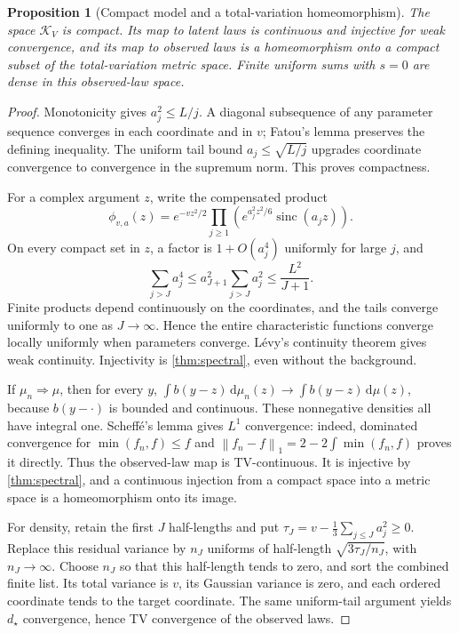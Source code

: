 \documentclass[11pt,letterpaper]{article}
\numberwithin{equation}{section}
\newtheorem{proposition}[theorem]{Proposition}
\theoremstyle{definition}
\theoremstyle{remark}
\newcommand{\sinc}{\operatorname{sinc}}
\newcommand{\norm}[1]{\left\lVert#1\right\rVert}
\newcommand{\dd}{\,\mathrm d}
\newcommand{\K}{\mathcal K_V}
\begin{document}
\begin{proposition}[Compact model and a total-variation homeomorphism]
\label{prop:compact}
The space $\K$ is compact. Its map to latent laws is continuous and injective
for weak convergence, and its map to observed laws is a homeomorphism onto a
compact subset of the total-variation metric space. Finite uniform sums with
$s=0$ are dense in this observed-law space.
\end{proposition}
\begin{proof}
Monotonicity gives $a_j^2\le L/j$. A diagonal subsequence of any parameter
sequence converges in each coordinate and in $v$; Fatou's lemma preserves
the defining inequality. The uniform tail bound $a_j\le\sqrt{L/j}$ upgrades
coordinate convergence to convergence in the supremum norm. This proves
compactness.

For a complex argument $z$, write the compensated product
\begin{equation}
 \phi_{v,a}(z)=e^{-vz^2/2}
 \prod_{j\ge1}\left(e^{a_j^2z^2/6}\sinc(a_jz)\right).
 \label{eq:compensated}
\end{equation}
On every compact set in $z$, a factor is $1+O(a_j^4)$ uniformly for large $j$,
and
\begin{equation}
 \sum_{j>J}a_j^4\le a_{J+1}^2\sum_{j>J}a_j^2\le\frac{L^2}{J+1}.
 \label{eq:tailfour}
\end{equation}
Finite products depend continuously on the coordinates, and the tails converge
uniformly to one as $J\to\infty$. Hence the entire characteristic functions
converge locally uniformly when parameters converge. L\'evy's continuity
theorem gives weak continuity. Injectivity is \cref{thm:spectral}, even
without the background.

If $\mu_n\Rightarrow\mu$, then for every $y$,
$\int b(y-z)\dd\mu_n(z)\to\int b(y-z)\dd\mu(z)$, because $b(y-\cdot)$ is
bounded and continuous. These nonnegative densities all have integral one.
Scheff\'e's lemma gives $L^1$ convergence: indeed, dominated convergence for
$\min(f_n,f)\le f$ and
$\norm{f_n-f}_1=2-2\int\min(f_n,f)$ proves it directly.
Thus the observed-law map is TV-continuous. It is injective by
\cref{thm:spectral}, and a continuous injection from a compact space into a
metric space is a homeomorphism onto its image.

For density, retain the first $J$ half-lengths and put
$\tau_J=v-\frac13\sum_{j\le J}a_j^2\ge0$.
Replace this residual variance by $n_J$ uniforms of half-length
$\sqrt{3\tau_J/n_J}$, with $n_J\to\infty$. Choose $n_J$ so that this
half-length tends to zero, and sort the combined finite list. Its total
variance is $v$, its Gaussian variance is zero, and each ordered coordinate
tends to the target coordinate. The same uniform-tail argument yields
$d_\star$ convergence, hence TV convergence of the observed laws.
\end{proof}
\end{document}
